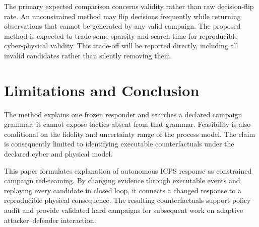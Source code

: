 \documentclass[conference]{IEEEtran}
\begin{document}
The primary expected comparison concerns validity rather than raw decision-flip
rate. An unconstrained method may flip decisions frequently while returning
observations that cannot be generated by any valid campaign. The proposed
method is expected to trade some sparsity and search time for reproducible
cyber-physical validity. This trade-off will be reported directly, including
all invalid candidates rather than silently removing them.

\section{Limitations and Conclusion}

The method explains one frozen responder and searches a declared campaign
grammar; it cannot expose tactics absent from that grammar. Feasibility is also
conditional on the fidelity and uncertainty range of the process model. The
claim is consequently limited to identifying executable counterfactuals under
the declared cyber and physical model.

This paper formulates explanation of autonomous ICPS response as constrained
campaign red-teaming. By changing evidence through executable events and
replaying every candidate in closed loop, it connects a changed response to a
reproducible physical consequence. The resulting counterfactuals support policy
audit and provide validated hard campaigns for subsequent work on adaptive
attacker--defender interaction.



\end{document}
